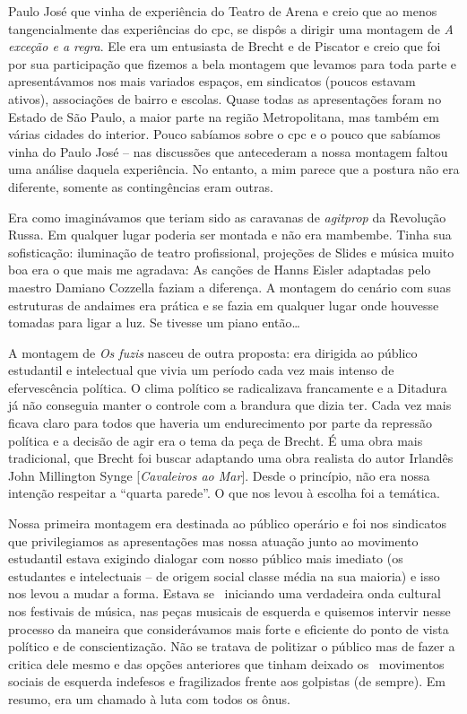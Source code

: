 Paulo José que vinha de experiência do Teatro de Arena e creio que ao
menos tangencialmente das experiências do {\sc cpc}, se dispôs a dirigir uma
montagem de {\it A exceção e a regra}. Ele era um entusiasta de Brecht e
de Piscator e creio que foi por sua participação que fizemos a bela
montagem que levamos para toda parte e apresentávamos nos mais variados
espaços, em sindicatos (poucos estavam ativos), associações de bairro e
escolas. Quase todas as apresentações foram no Estado de São Paulo, a
maior parte na região Metropolitana, mas também em várias cidades do
interior. Pouco sabíamos sobre o {\sc cpc} e o pouco que sabíamos vinha do
Paulo José -- nas discussões que antecederam a nossa montagem faltou uma
análise daquela experiência. No entanto, a mim parece que a postura não
era diferente, somente as contingências eram outras.

Era como imaginávamos que teriam sido as caravanas de {\it agitprop} da
Revolução Russa. Em qualquer lugar poderia ser montada e não era
mambembe. Tinha sua sofisticação: iluminação de teatro profissional,
projeções de Slides e música muito boa era o que mais me agradava: As
canções de Hanns Eisler adaptadas pelo maestro Damiano Cozzella faziam a
diferença. A montagem do cenário com suas estruturas de andaimes era
prática e se fazia em qualquer lugar onde houvesse tomadas para ligar a
luz. Se tivesse um piano então\ldots{}

\subject{Montagem dos Fuzis de Tereza Carrar}

A montagem de {\it Os fuzis} nasceu de outra proposta: era dirigida ao
público estudantil e intelectual que vivia um período cada vez mais
intenso de efervescência política. O clima político se radicalizava
francamente e a Ditadura já não conseguia manter o controle com a
brandura que dizia ter. Cada vez mais ficava claro para todos que
haveria um endurecimento por parte da repressão política e a decisão de
agir era o tema da peça de Brecht. É uma obra mais tradicional, que
Brecht foi buscar adaptando uma obra realista do autor Irlandês John
Millington Synge {[}{\it Cavaleiros ao Mar}{]}. Desde o princípio, não
era nossa intenção respeitar a “quarta parede”. O que nos levou à
escolha foi a temática.

Nossa primeira montagem era destinada ao público operário e foi nos
sindicatos que privilegiamos as apresentações mas nossa atuação junto ao
movimento estudantil estava exigindo dialogar com nosso público mais
imediato (os estudantes e intelectuais -- de origem social classe média
na sua maioria) e isso nos levou a mudar a forma. Estava se ~iniciando
uma verdadeira onda cultural nos festivais de música, nas peças musicais
de esquerda e quisemos intervir nesse processo da maneira que
considerávamos mais forte e eficiente do ponto de vista político e de
conscientização. Não se tratava de politizar o público mas de fazer a
critica dele mesmo e das opções anteriores que tinham deixado os
~movimentos sociais de esquerda indefesos e fragilizados frente aos
golpistas (de sempre). Em resumo, era um chamado à luta com todos os
ônus.

